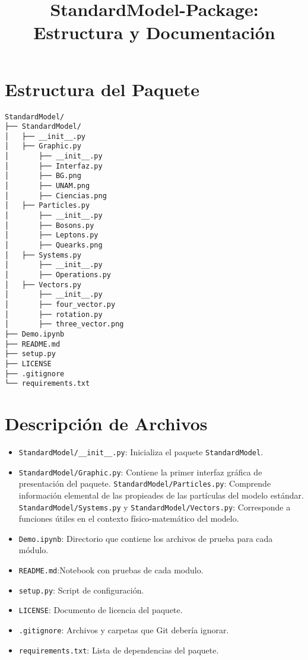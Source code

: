 \documentclass{article}
\title{StandardModel-Package: Estructura y Documentación}
\begin{document}
\maketitle
\section{Estructura del Paquete}

\begin{verbatim}
StandardModel/
├── StandardModel/
│   ├── __init__.py
│   ├── Graphic.py
│       ├── __init__.py
│       ├── Interfaz.py
│       ├── BG.png
│       ├── UNAM.png
│       ├── Ciencias.png
│   ├── Particles.py
│       ├── __init__.py
│       ├── Bosons.py
│       ├── Leptons.py
│       ├── Quearks.png
│   ├── Systems.py
│       ├── __init__.py
│       ├── Operations.py
│   ├── Vectors.py
│       ├── __init__.py
│       ├── four_vector.py
│       ├── rotation.py
│       ├── three_vector.png
├── Demo.ipynb
├── README.md
├── setup.py
├── LICENSE
├── .gitignore
└── requirements.txt
\end{verbatim}

\section{Descripción de Archivos}
\begin{itemize}
    \item \texttt{StandardModel/\_\_init\_\_.py}: Inicializa el paquete \texttt{StandardModel}.
    \item \texttt{StandardModel/Graphic.py}: Contiene la primer interfaz gráfica de presentación del paquete. \texttt{StandardModel/Particles.py}: Comprende información elemental de las propieades de las partículas del modelo estándar. \texttt{StandardModel/Systems.py} y \texttt{StandardModel/Vectors.py}: Corresponde a funciones útiles en el contexto físico-matemático del modelo. 
    \item \texttt{Demo.ipynb}: Directorio que contiene los archivos de prueba para cada módulo.
    \item \texttt{README.md}:Notebook con pruebas de cada modulo.
    \item \texttt{setup.py}: Script de configuración.
    \item \texttt{LICENSE}: Documento de licencia del paquete.
    \item \texttt{.gitignore}: Archivos y carpetas que Git debería ignorar.
    \item \texttt{requirements.txt}: Lista de dependencias del paquete.
\end{itemize}
\end{document}
